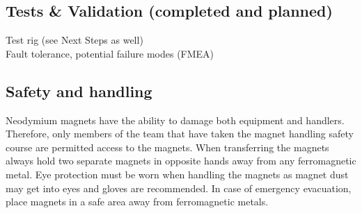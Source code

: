 \documentclass[main.tex]{subfiles}
\begin{document}
    \subsection{Tests \& Validation (completed and planned)}
    Test rig (see Next Steps as well)\\
    Fault tolerance, potential failure modes (FMEA)

    \subsection{Safety and handling}
    Neodymium magnets have the ability to damage both equipment and handlers. Therefore, only members of the team that have taken the magnet handling safety course are permitted access to the magnets. When transferring the magnets always hold two separate magnets in opposite hands away from any ferromagnetic metal. Eye protection must be worn when handling the magnets as magnet dust may get into eyes and gloves are recommended. In case of emergency evacuation, place magnets in a safe area away from ferromagnetic metals. 
    
\end{document}
